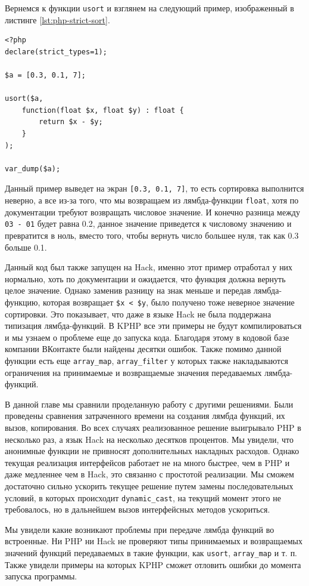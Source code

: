 Вернемся к функции \verb|usort| и взглянем на следующий пример, изображенный в листинге \ref{lst:php-strict-sort}.
\begin{lstlisting}[caption={Пример типизации в PHP7}, label={lst:php-strict-type}]
<?php
declare(strict_types=1);

$a = [0.3, 0.1, 7];

usort($a,
    function(float $x, float $y) : float {
        return $x - $y;
    }
);

var_dump($a);
\end{lstlisting}

Данный пример выведет на экран \verb|[0.3, 0.1, 7]|, то есть сортировка выполнится неверно, а все из-за того, что мы возвращаем из лямбда-функции \verb|float|, хотя по документации требуют возвращать числовое значение.
И конечно разница между \verb|03 - 01| будет равна 0.2, данное значение приведется к числовому значению и превратится в ноль, вместо того, чтобы вернуть число большее нуля, так как 0.3 больше 0.1.

Данный код был также запущен на Hack, именно этот пример отработал у них нормально, хоть по документации и ожидается, что функция должна вернуть целое значение.
Однако заменив разницу на знак меньше и передав лямбда-функцию, которая возвращает \verb|$x < $y|, было получено тоже неверное значение сортировки.
Это показывает, что даже в языке Hack не была поддержана типизация лямбда-функций.
В KPHP все эти примеры не будут компилироваться и мы узнаем о проблеме еще до запуска кода.
Благодаря этому в кодовой базе компании ВКонтакте были найдены десятки ошибок.
Также помимо данной функции есть еще \verb|array_map|, \verb|array_filter| у которых также накладываются ограничения на принимаемые и возвращаемые значения передаваемых лямбда-функций.

\chapterconclusion
В данной главе мы сравнили проделанную работу с другими решениями.
Были проведены сравнения затраченного времени на создания лямбда функций, их вызов, копирования.
Во всех случаях реализованное решение выигрывало PHP в несколько раз, а язык Hack на несколько десятков процентов.
Мы увидели, что анонимные функции не привносят дополнительных накладных расходов.
Однако текущая реализация интерфейсов работает не на много быстрее, чем в PHP и даже медленнее чем в Hack, это связанно с простотой реализации.
Мы сможем достаточно сильно ускорить текущее решение путем замены последовательных условий, в которых происходит \verb|dynamic_cast|, на текущий момент этого не требовалось, но в дальнейшем вызов интерфейсных методов ускориться.

Мы увидели какие возникают проблемы при передаче лямбда функций во встроенные.
Ни PHP ни Hack не проверяют типы принимаемых и возвращаемых значений функций передаваемых в такие функции, как \verb|usort|, \verb|array_map| и т. п.
Также увидели примеры на которых KPHP сможет отловить ошибки до момента запуска программы.
